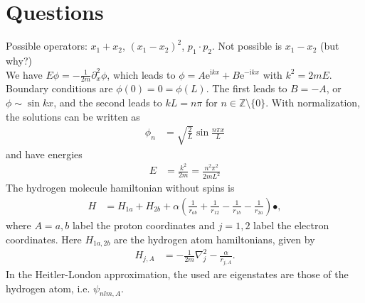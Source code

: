 \documentclass[english, parskip=full]{scrartcl}
\title{\titel}
\author{\autor}
\date{\today}
\newcommand{\kla}{}
\def\I{\text{i}}
\def\E{\text{e}}
\begin{document}
\maketitle  %

\section{Questions}
Possible operators: $x_1+x_2$, $(x_1-x_2)^2$, $p_1\cdot p_2$. 
Not possible is $x_1-x_2$ (but why?)
\\
We have $E\phi=-\frac{1}{2m}\partial_x^2\phi$, which leads to $\phi=A\E^{\I kx}+B\E^{-\I kx}$ with $k^2=2mE$.
Boundary conditions are $\phi(0)=0=\phi(L)$.
The first leads to $B=-A$, or $\phi\sim \sin kx$, and the second leads to $kL=n\pi$ for $n\in\mathbb{Z}\setminus\{0\}$.
With normalization, the solutions can be written as
\begin{align*}
\phi_n&=\sqrt{\frac{2}{L}}\sin\frac{n\pi x}{L}
\end{align*}
and have energies 
\begin{align*}
E&=\frac{k^2}{2m}=\frac{n^2\pi^2}{2mL^2}
\end{align*}
The hydrogen molecule hamiltonian without spins is
\begin{align*}
H&=H_{1a}+H_{2b}+\alpha\kla\left( {\frac{1}{r_{ab}}+\frac{1}{r_{12}}-\frac{1}{r_{1b}}-\frac{1}{r_{2a}}} \right)•,
\end{align*}
where $A=a,b$ label the proton coordinates and $j=1,2$ label the electron coordinates.
Here $H_{1a,2b}$ are the hydrogen atom hamiltonians, given by
\begin{align*}
H_{j,A}&=-\frac{1}{2m}\nabla_j^2-\frac{\alpha}{r_{j,A}}.
\end{align*}
In the Heitler-London approximation, the used are eigenstates are those of the hydrogen atom, i.e. $\psi_{nlm,A}$.
\end{document}
